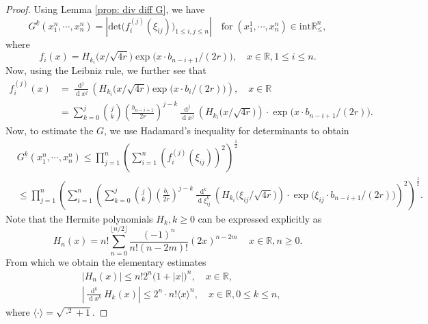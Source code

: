 \documentclass[11pt, reqno]{amsart}
\numberwithin{equation}{section}
\newcommand{\R}{\ensuremath{\mathbb{R}}}
\newcommand{\diff}{\ensuremath{\operatorname{d}\!}}
\begin{document}
\begin{proof}
Using Lemma \ref{prop: div diff G}, we have 
\begin{equation*}
      G^{\underline{k}}(x^n_1,\cdots, x^n_n) = \left\vert\mathrm{det}\big(f_i^{(j)}(\xi_{ij})\big)_{1\le i, j\le n}\right\vert \quad \mathrm{for}\; (x^1_1, \cdots, x^n_n)\in \mathrm{int}\R^n_{\le},
\end{equation*}
where 
\begin{equation*}
    f_i(x) =  H_{k_i}\big(x/\sqrt{4r}\big) \exp\big(x \cdot b_{n-i+1}/(2r)\big),\quad x\in \R,  1\le i \le n.
\end{equation*}
Now, using the Leibniz rule, we further see that
\begin{equation*}
\begin{array}{cc}
     f_i^{(j)}(x) & =  \displaystyle\frac{\diff ^j}{\diff x^j} \left(H_{k_i}\big(x/\sqrt{4r}\big) \exp\big(x \cdot b_i/(2r)\big)\right),\quad x\in \R \\
     &  = \displaystyle\sum_{k=0}^j {\binom{j}{k}}\left(\frac{b_{n-i+1}}{2r}\right)^{j-k}\displaystyle\frac{\diff ^j}{\diff x^j} \left(H_{k_i}\big(x/\sqrt{4r}\big)\right)\cdot \exp\big(x \cdot b_{n-i+1}/(2r)\big).
\end{array}
\end{equation*}
Now, to estimate the $G$, we use Hadamard's inequality for determinants to obtain
\begin{equation*}
    \begin{array}{cc}
        &G^{\underline{k}}(x^n_1,\cdots, x^n_n) \le  \displaystyle\prod_{j=1}^n \left(\displaystyle\sum_{i=1}^n (f_i^{(j)}(\xi_{ij}))^2\right)^{\frac{1}{2}}\\
        &\le \displaystyle\prod_{j=1}^n \left(\displaystyle\sum_{i=1}^n \left(\displaystyle\sum_{k=0}^j {\binom{j}{k}}\left(\frac{b_i}{2r}\right)^{j-k}\displaystyle\frac{\diff ^k}{\diff \xi_{ij}^k} \left(H_{k_i}\big(\xi_{ij}/\sqrt{4r}\big)\right)\cdot \exp\big(\xi_{ij} \cdot b_{n-i+1}/(2r)\big)\right)^2\right)^{\frac{1}{2}}.
    \end{array}
\end{equation*}
Note that the Hermite polynomials $H_k, k\ge 0$ can be expressed explicitly as 
     \begin{equation*}
         H_n(x) = n!\displaystyle\sum_{n=0}^{\lfloor n/2\rfloor}\frac{(-1)^{n}}{n!(n-2m)!}(2x)^{n-2m}\, \quad x\in \R, n\ge 0.
     \end{equation*}
From which we obtain the elementary estimates
     \begin{equation*}
     \begin{array}{cc}
          & |H_n(x)|\le n!2^n \big(1+|x|\big)^n,\quad x\in \R, \\
          & \left|\frac{\diff^k}{\diff x^k} H_k(x)\right|\le 2^n \cdot n!\langle x\rangle^{n},\quad x\in \R, 0\le k\le n,
     \end{array}
     \end{equation*}
     where $\langle \cdot \rangle = \sqrt{\cdot ^2 + 1}$.


\end{proof}
\end{document}
